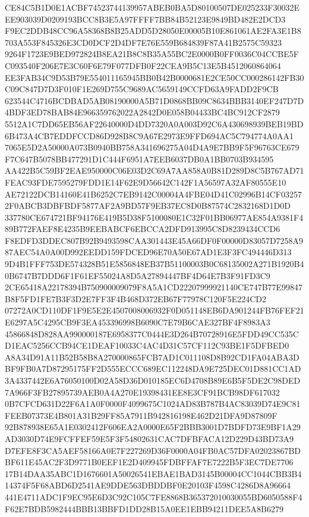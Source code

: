 \documentclass[UTF8,fontset=fandol,zihao=-4,a4paper]{ctexart}
\begin{document}
{{CE84C5B1D0E1ACBF74523744139957ABEB0BA5D80100507DE025233F30032EEE903039D0209193BCC8B3E5A97FFFF7BB84B52123E9849BD482E2DCD3
F9EC2DDB48CC96A58368B8B25ADD5D28050E00005B10E861061AE2FA3E1B8703A553F845326E3CD0DCF2D4DF7E76E559B684839F87A41B2575C59323
9264F1723E9BED972824B8EA21B8C8B35A55BC2E0000B0FF0036C04CCBE5FC093540F206E7E3C60F6E79F077DFB0F22CEA9B5C13E5B4512060864064
EE3FAB34C9D53B79E554011165945BB0B42B0000681E2CE50CC000286142FB30C09C847D7D3F010F1E269D755C9689AC5659149CCFD63A9FADD2F9CB
623544C4716BCDBAD5AB08190000A5B71D0868BB09C8634BBB3140EF247D7D4BDF3ED78BAB84E966359762022A2842D0E058B04433BC4BC912CF2879
5512A1C7DD65EB56AF22640000D4DD7320A0A003D92C6A430698939BEB19BD6B473A4CB7EDDFCCD86D928B8C9A67E2973E9FFD694AC5C794774A0AA1
7065E5D2A50000A073B0940BB758A341696275A04D4A9E7BB9F5F96763CE679F7C647B5078BB477291D1C444F6951A7EEB6037DB0A1BB0703B934595
AA422B5C59BF2EAE950000C06E03D2C69A7AA858A0B81D289D8C5B767AD71FEAC93FDE7595279FDD1E14F62E9D56642C142F1A56597A32AF80555E10
AE72122DCB14160E41B6252C7EB9142C00004A4FBE04D41C02996B14CF032572F0ABCB3DBFBDF5877AF2A9BD57F9EB37EC8D0B87574C2832168D1D0D
337780CE674721BF94176E419B5D38F5100080E1C32F01BB06977AE854A9381F489B772FAEF8E4235B9EEBABCF6EBCCA2DFD913995C8D8239434CCD6
F8EDFD3DDEC807B92B9493598CAA301443E45A66DF0F00000D83057D7258A987AEC54A0A00D992EEDD159FDCED96E70A50E67AD1E3F3FC494446D313
9D4B1FFF753DE574328B51E5856848EB37B51100003B0C68135002A271B1920B40B6747B7DDD6F1F61EF55024A8D5A27894447BF4D64E7B3F91FD3C9
2CE65418A22178394B750900009079F8A5A1CD22207999921140CE747B77E99847B8F5FD1FE7B3F3D2E7FF3F4B468D372EB67F77978C120F5E224CD2
07272A0CD110DF1F9E5E2E4507008006932F0D051148EB6DA901244FB76FEF21E6297A5C4295CB9F3EA453396998B6090C7E79B6CAE327BF4F8983A3
45866848D828AA990000187E6958377C0444E3D264B70728916E5FDD49CC535CD1EAC5256CCB94CE1DEAF10033C4AC4D31C57CF112C93BE1F5DFBED0
A8A34D91A11B52B58B8A270000865FCB7AD1C011108D8B92CD1FA04ABA3DBF9FB0A7D87295175FF2D555ECCC689EC112248DA9E725DEC01D881CC1AD
3A4337442E6A76050100D02A58D36D010185EC6D4708B89E6B5F5DE2C98DED7A966F3FB27895739AEB0A4A270E19398431EE8E3CF91BCB98DF617032
0B7CFCD631D22F6A1A0F0000F4099675C1024AD83B787B4AC83039D74E9C81FEEB07373E4B801A31B29FF85A7911B942816198E462D21DFA9D87809F
92B878938E65A1E0302412F606EA2A0000E65F2BBB3001D7BDFD73E9BF1A29AD3030D74E9FCFFEF59E5F3F54802631CAC7DFBFACA12D229D43BD73A9
D7EFE8F3CA5AEF58166A0E7F227269D36F0000A04FB0AC57DFA02023867BDBF611E45AC2F3D9771B0EEF1E2D409945FDBFFAF7E7222B5F3EC7DE7706
17B14DAA35ABC1D1676601A50026541EBAE1BAD3145B00004CC1044CBB3B414374F5F68ABD6D2541AE9DDE563DBDDBF0E20103F4598C4286D8A96664
441E4711ADC1F9EC95E6D3C92C105C7FE8868B365372010030055BD6050588F4F62E7BDB5982444BBB13BBFD1DD28B15A0EE1EBB94211DEE5A8B6279
}}
\end{document}
